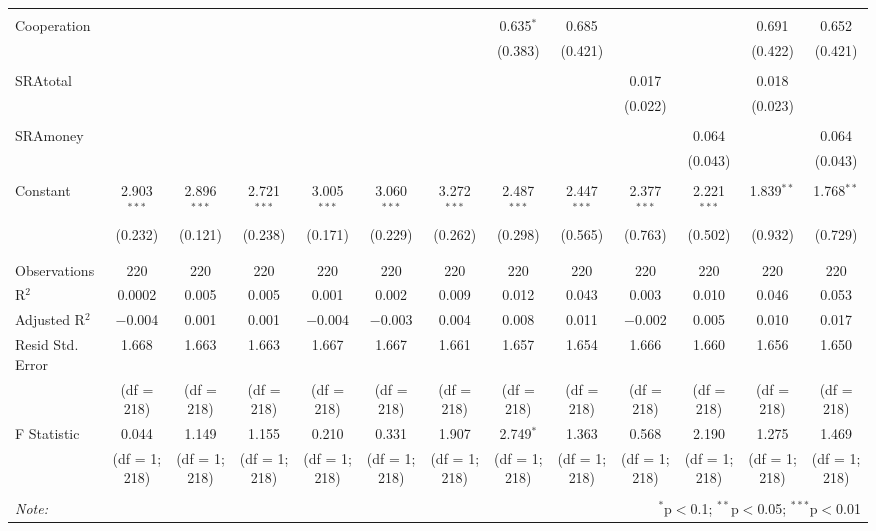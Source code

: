 \begin{table}[H]
\begin{adjustbox}{width=\textwidth}
\begin{tabular}{@{\extracolsep{5pt}}lcccccccccccc}
  & & & & & & & & & & & & \\ 
 Cooperation &  &  &  &  &  &  & 0.635$^{*}$ & 0.685 &  &  & 0.691 & 0.652 \\ 
  &  &  &  &  &  &  & (0.383) & (0.421) &  &  & (0.422) & (0.421) \\ 
  & & & & & & & & & & & & \\ 
 SRAtotal &  &  &  &  &  &  &  &  & 0.017 &  & 0.018 &  \\ 
  &  &  &  &  &  &  &  &  & (0.022) &  & (0.023) &  \\ 
  & & & & & & & & & & & & \\ 
 SRAmoney &  &  &  &  &  &  &  &  &  & 0.064 &  & 0.064 \\ 
  &  &  &  &  &  &  &  &  &  & (0.043) &  & (0.043) \\ 
  & & & & & & & & & & & & \\ 
 Constant & 2.903$^{***}$ & 2.896$^{***}$ & 2.721$^{***}$ & 3.005$^{***}$ & 3.060$^{***}$ & 3.272$^{***}$ & 2.487$^{***}$ & 2.447$^{***}$ & 2.377$^{***}$ & 2.221$^{***}$ & 1.839$^{**}$ & 1.768$^{**}$ \\ 
  & (0.232) & (0.121) & (0.238) & (0.171) & (0.229) & (0.262) & (0.298) & (0.565) & (0.763) & (0.502) & (0.932) & (0.729) \\ 
  & & & & & & & & & & & & \\ 
\hline \\[-1.8ex] 
Observations & 220 & 220 & 220 & 220 & 220 & 220 & 220 & 220 & 220 & 220 & 220 & 220 \\ 
R$^{2}$ & 0.0002 & 0.005 & 0.005 & 0.001 & 0.002 & 0.009 & 0.012 & 0.043 & 0.003 & 0.010 & 0.046 & 0.053 \\ 
Adjusted R$^{2}$ & $-$0.004 & 0.001 & 0.001 & $-$0.004 & $-$0.003 & 0.004 & 0.008 & 0.011 & $-$0.002 & 0.005 & 0.010 & 0.017 \\ 
Resid Std. Error & 1.668 & 1.663 & 1.663 & 1.667 & 1.667 & 1.661 & 1.657 & 1.654 & 1.666  & 1.660 & 1.656  & 1.650 \\ 
& (df = 218) & (df = 218) & (df = 218) & (df = 218) & (df = 218) & (df = 218) & (df = 218) & (df = 218) & (df = 218) & (df = 218) & (df = 218) & (df = 218) \\
F Statistic & 0.044 & 1.149  & 1.155 & 0.210  & 0.331 & 1.907 & 2.749$^{*}$ & 1.363 & 0.568 & 2.190 & 1.275  & 1.469 \\ 
& (df = 1; 218) & (df = 1; 218) & (df = 1; 218) & (df = 1; 218) & (df = 1; 218) & (df = 1; 218) & (df = 1; 218) & (df = 1; 218) & (df = 1; 218) & (df = 1; 218) & (df = 1; 218) & (df = 1; 218) \\
\hline 
\hline \\[-1.8ex] 
\textit{Note:}  & \multicolumn{12}{r}{$^{*}$p$<$0.1; $^{**}$p$<$0.05; $^{***}$p$<$0.01} \\ 
\end{tabular} 
\end{adjustbox}
\end{table} 

